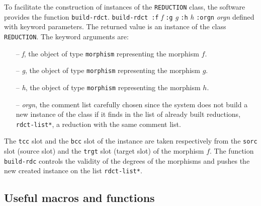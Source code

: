 To facilitate the construction of instances of the  {\tt REDUCTION} class, the
software provides the function {\tt build-rdct}.
\vskip 0.45cm
{\tt build-rdct :f} {\em f} {\tt :g} {\em g} {\tt :h} {\em h} {\tt :orgn} {\em orgn}
\vskip 0.40cm
defined with keyword parameters. The returned value is an instance of the class {\tt REDUCTION}.
The keyword arguments are:
\begin{itemize}
\item[--] {\em f}, the object of type {\tt morphism}  representing the morphism $f$.
\item[--] {\em g}, the object of type {\tt morphism}  representing the morphism $g$.
\item[--] {\em h}, the object of type {\tt morphism}  representing the morphism $h$.
\item[--] {\em orgn}, the comment list carefully chosen since the system does not
build a new instance of the class if it finds in the list of already built reductions, {\tt *rdct-list*},
a reduction  with the same comment list.
\end{itemize}
The {\tt tcc} slot and the {\tt bcc} slot of the instance are taken respectively
from the {\tt sorc} slot (source slot) and  the {\tt trgt} slot (target slot) of the morphism $f$.
The function {\tt build-rdc} controls the validity of the degrees of the morphisms and
pushes the new created  instance on the list {\tt *rdct-list*}.

\newpage

\subsection {Useful macros and functions}

